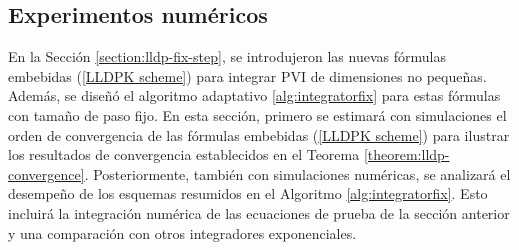 \subsection{Experimentos numéricos}\label{section:num-exp-lldp-fix-step}
En la Sección \ref{section:lldp-fix-step}, se introdujeron las nuevas fórmulas embebidas (\ref{LLDPK scheme}) para integrar PVI de dimensiones no pequeñas. Además, se diseñó el algoritmo adaptativo \ref{alg:integratorfix} para estas fórmulas con tamaño de paso fijo. En esta sección, primero se estimará con simulaciones el orden de convergencia de las fórmulas embebidas (\ref{LLDPK scheme}) para ilustrar los resultados de convergencia establecidos en el Teorema \ref{theorem:lldp-convergence}. Posteriormente, también con simulaciones numéricas, se analizará el desempeño de los esquemas resumidos en el Algoritmo \ref{alg:integratorfix}. Esto incluirá la integración numérica de las ecuaciones de prueba de la sección anterior y una comparación con otros integradores exponenciales.

